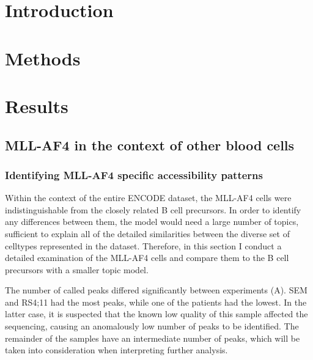 

\section{Introduction} \label{ch5:intro}

\section{Methods} \label{ch5:methods}

\section{Results} \label{ch5:results}

\subsection{MLL-AF4 in the context of other blood cells}

\subsubsection{Identifying MLL-AF4 specific accessibility patterns}

Within the context of the entire ENCODE dataset, the MLL-AF4 cells were indistinguishable from the closely related B cell precursors. In order to identify any differences between them, the model would need a large number of topics, sufficient to explain all of the detailed similarities between the diverse set of celltypes represented in the dataset. Therefore, in this section I conduct a detailed examination of the MLL-AF4 cells and compare them to the B cell precursors with a smaller topic model. 

The number of called peaks differed significantly between experiments (A). SEM and RS4;11 had the most peaks, while one of the patients had the lowest. In the latter case, it is suspected that the known low quality of this sample affected the sequencing, causing an anomalously low number of peaks to be identified. The remainder of the samples have an intermediate number of peaks, which will be taken into consideration when interpreting further analysis. 

